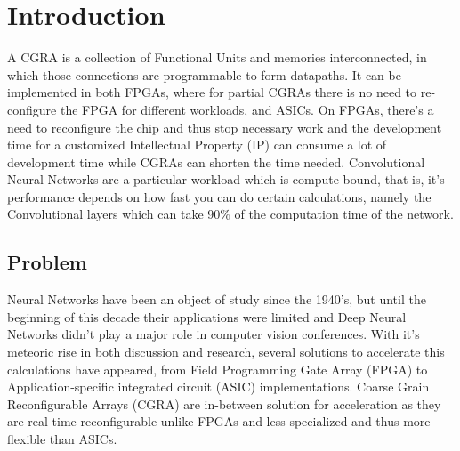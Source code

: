 
\chapter{Introduction}
\label{chapter:introduction}

A CGRA is a collection of Functional Units and memories interconnected, in which those connections are programmable to form datapaths.
It can be implemented in both FPGAs, where for partial CGRAs there is no need to re-configure the FPGA for different workloads, and ASICs.
On FPGAs, there's a need to reconfigure the chip and thus stop necessary work and the development time for a customized Intellectual Property (IP) can consume a lot of
development time while CGRAs can shorten the time needed.
Convolutional Neural Networks are a particular workload which is compute bound, that is, it's performance depends on how fast you can do certain calculations, namely the Convolutional
layers which can take 90$\%$ of the computation time of the network.


\section{Problem}
\label{section:problem}

Neural Networks have been an object of study since the 1940's, but until the beginning of this decade their
applications were limited and Deep Neural Networks didn't play a major role in computer vision conferences.
With it's meteoric rise in both discussion and research, several solutions to accelerate this calculations have appeared,
from Field Programming Gate Array (FPGA) to Application-specific integrated circuit (ASIC) implementations.
Coarse Grain Reconfigurable Arrays (CGRA) are in-between solution for acceleration  as they are real-time reconfigurable unlike FPGAs and less
specialized and thus more flexible than ASICs.

